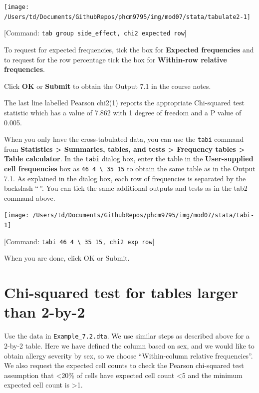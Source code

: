 \documentclass[
]{memoir}
\begin{document}
\texttt{[image: /Users/td/Documents/GithubRepos/phcm9795/img/mod07/stata/tabulate2-1]}

{[}Command: \texttt{tab\ group\ side\_effect,\ chi2\ expected\ row}{]}

To request for expected frequencies, tick the box for \textbf{Expected frequencies} and to request for the row percentage tick the box for \textbf{Within-row relative frequencies}.

Click \textbf{OK} or \textbf{Submit} to obtain the Output 7.1 in the course notes.

The last line labelled Pearson chi2(1) reports the appropriate Chi-squared test statistic which has a value of 7.862 with 1 degree of freedom and a P value of 0.005.

When you only have the cross-tabulated data, you can use the \texttt{tabi} command from \textbf{Statistics \textgreater{} Summaries, tables, and tests \textgreater{} Frequency tables \textgreater{} Table calculator}. In the \texttt{tabi} dialog box, enter the table in the \textbf{User-supplied cell frequencies} box as \texttt{46\ 4\ \textbackslash{}\ 35\ 15} to obtain the same table as in the Output 7.1. As explained in the dialog box, each row of frequencies is separated by the backslash ``\,''. You can tick the same additional outputs and tests as in the tab2 command above.

\texttt{[image: /Users/td/Documents/GithubRepos/phcm9795/img/mod07/stata/tabi-1]}

{[}Command: \texttt{tabi\ 46\ 4\ \textbackslash{}\ 35\ 15,\ chi2\ exp\ row}{]}

When you are done, click OK or Submit.

\hypertarget{chi-squared-test-for-tables-larger-than-2-by-2}{%
\section{Chi-squared test for tables larger than 2-by-2}\label{chi-squared-test-for-tables-larger-than-2-by-2}}

Use the data in \texttt{Example\_7.2.dta}. We use similar steps as described above for a 2-by-2 table. Here we have defined the column based on sex, and we would like to obtain allergy severity by sex, so we choose ``Within-column relative frequencies''. We also request the expected cell counts to check the Pearson chi-squared test assumption that \textless20\% of cells have expected cell count \textless5 and the minimum expected cell count is \textgreater1.
\end{document}

